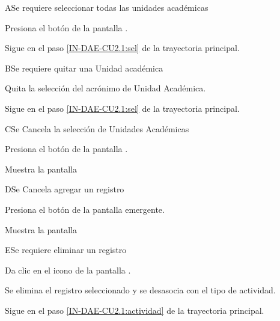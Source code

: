 
\begin{UCtrayectoriaA}{A}{Se requiere seleccionar todas las unidades académicas }

\UCpaso [\UCactor] 	Presiona el botón  de la pantalla .

\UCpaso Sigue en el paso \ref{IN-DAE-CU2.1:sel}  de la trayectoria principal.

\end{UCtrayectoriaA}


%
\begin{UCtrayectoriaA}{B}{Se requiere quitar una Unidad académica}
	
	\UCpaso [\UCactor] 	Quita la selección del acrónimo de Unidad Académica.
	
	\UCpaso Sigue en el paso \ref{IN-DAE-CU2.1:sel}  de la trayectoria principal.
	
\end{UCtrayectoriaA}

%
\begin{UCtrayectoriaA}{C}{Se Cancela la selección de Unidades Académicas}
	
	\UCpaso [\UCactor] Presiona el botón  de la pantalla .
	
	\UCpaso Muestra la pantalla  
	
\end{UCtrayectoriaA}


%
\begin{UCtrayectoriaA}{D}{Se Cancela agregar un registro}
	
	\UCpaso [\UCactor] Presiona el botón  de la pantalla emergente.
	
	\UCpaso Muestra la pantalla  
	
\end{UCtrayectoriaA}

%

\begin{UCtrayectoriaA}{E}{Se requiere eliminar un registro}
	
	\UCpaso [\UCactor] 	Da clic en el icono \IURechazar de la pantalla  .

	\UCpaso Se elimina el registro seleccionado y se desasocia con el tipo de actividad.
	
	\UCpaso Sigue en el paso \ref{IN-DAE-CU2.1:actividad}  de la trayectoria principal.
	
\end{UCtrayectoriaA}
%

